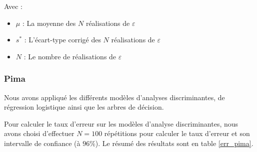 \documentclass{article}
\begin{document}
Avec : 
\begin{itemize}
\item $\mu$ : La moyenne des $N$ réalisations de $\varepsilon$
\item $s^*$ : L'écart-type corrigé des $N$ réalisations de $\varepsilon$
\item $N$ : Le nombre de réalisations de $\varepsilon$
\end{itemize}


\subsubsection{Pima}
Nous avons appliqué les différents modèles d'analyses discriminantes, de régression logistique ainsi que les arbres de décision.

Pour calculer le taux d'erreur sur les modèles d'analyse discriminantes, nous avons choisi d'effectuer $N=100$ répétitions pour calculer le taux d'erreur et son intervalle de confiance (à $96\%$). Le résumé des résultats sont en table \ref{err_pima}.
\end{document}
